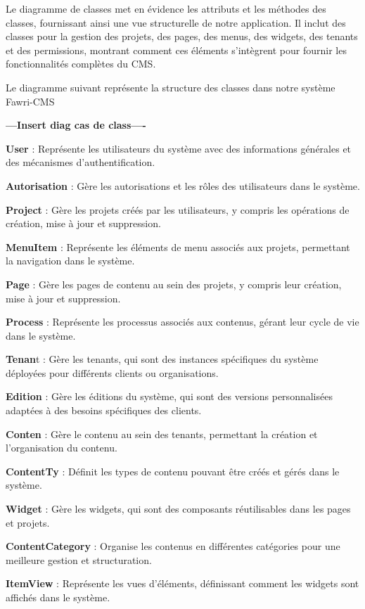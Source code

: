 Le diagramme de classes met en évidence les attributs et les méthodes des classes, fournissant ainsi une vue structurelle de notre application. Il inclut des classes pour la gestion des projets, des pages, des menus, des widgets, des tenants et des permissions, montrant comment ces éléments s'intègrent pour fournir les fonctionnalités complètes du CMS.

Le diagramme suivant représente la structure des classes dans notre système Fawri-CMS

\textbf{---Insert diag cas de class----}



\textbf{User} : Représente les utilisateurs du système avec des informations générales et des mécanismes d'authentification.

\textbf{Autorisation} : Gère les autorisations et les rôles des utilisateurs dans le système.

\textbf{Project} : Gère les projets créés par les utilisateurs, y compris les opérations de création, mise à jour et suppression.

\textbf{MenuItem} : Représente les éléments de menu associés aux projets, permettant la navigation dans le système.

\textbf{Page} : Gère les pages de contenu au sein des projets, y compris leur création, mise à jour et suppression.

\textbf{Process} : Représente les processus associés aux contenus, gérant leur cycle de vie dans le système.

\textbf{Tenan}t : Gère les tenants, qui sont des instances spécifiques du système déployées pour différents clients ou organisations.

\textbf{Edition} : Gère les éditions du système, qui sont des versions personnalisées adaptées à des besoins spécifiques des clients.

\textbf{Conten} : Gère le contenu au sein des tenants, permettant la création et l'organisation du contenu.

\textbf{ContentTy} : Définit les types de contenu pouvant être créés et gérés dans le système.

\textbf{Widget} : Gère les widgets, qui sont des composants réutilisables dans les pages et projets.

\textbf{ContentCategory} : Organise les contenus en différentes catégories pour une meilleure gestion et structuration.

\textbf{ItemView} : Représente les vues d'éléments, définissant comment les widgets sont affichés dans le système.



